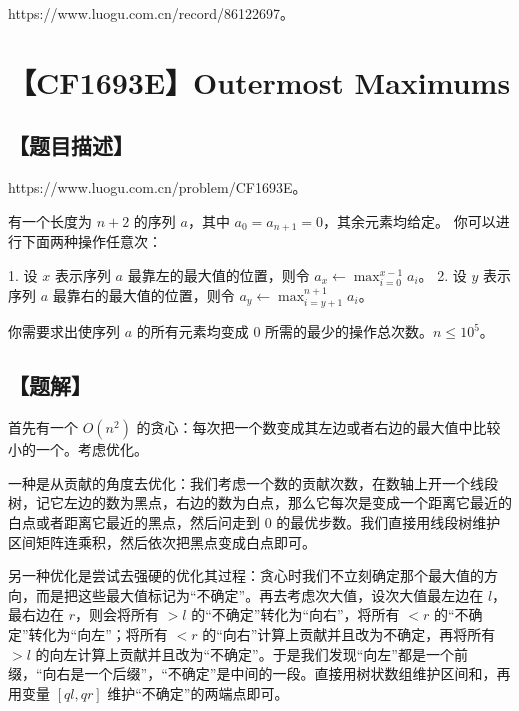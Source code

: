 \documentclass[UTF8,12pt,a4paper]{ctexart}
\begin{document}
	https://www.luogu.com.cn/record/86122697。
	
	
	\section*{【CF1693E】Outermost Maximums}
	
	\subsection*{【题目描述】}
	
	https://www.luogu.com.cn/problem/CF1693E。
	
	有一个长度为 $n+2$ 的序列 $a$，其中 $a_0=a_{n+1}=0$，其余元素均给定。  
	你可以进行下面两种操作任意次：
	
	1. 设 $x$ 表示序列 $a$ 最靠左的最大值的位置，则令 $a_x\leftarrow \max_{i=0}^{x-1}a_i$。
	2. 设 $y$ 表示序列 $a$ 最靠右的最大值的位置，则令 $a_y\leftarrow \max_{i=y+1}^{n+1}a_i$。
	
	你需要求出使序列 $a$ 的所有元素均变成 $0$ 所需的最少的操作总次数。$n\le 10^5$。
	
	\subsection*{【题解】}
	
	首先有一个 $O(n^2)$ 的贪心：每次把一个数变成其左边或者右边的最大值中比较小的一个。考虑优化。
	
	一种是从贡献的角度去优化：我们考虑一个数的贡献次数，在数轴上开一个线段树，记它左边的数为黑点，右边的数为白点，那么它每次是变成一个距离它最近的白点或者距离它最近的黑点，然后问走到 $0$ 的最优步数。我们直接用线段树维护区间矩阵连乘积，然后依次把黑点变成白点即可。
	
	另一种优化是尝试去强硬的优化其过程：贪心时我们不立刻确定那个最大值的方向，而是把这些最大值标记为“不确定”。再去考虑次大值，设次大值最左边在 $l$，最右边在 $r$，则会将所有 $>l$ 的“不确定”转化为“向右”，将所有 $<r$ 的“不确定”转化为“向左”；将所有 $<r$ 的“向右”计算上贡献并且改为不确定，再将所有 $>l$ 的向左计算上贡献并且改为“不确定”。于是我们发现“向左”都是一个前缀，“向右是一个后缀”，“不确定”是中间的一段。直接用树状数组维护区间和，再用变量 $[ql,qr]$ 维护“不确定”的两端点即可。
	
\end{document}
